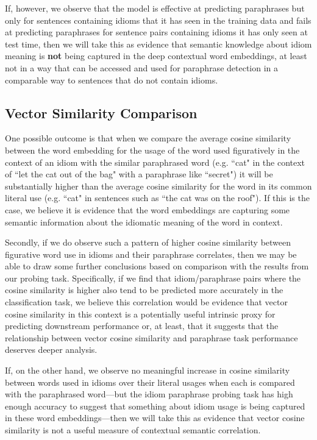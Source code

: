 \documentclass[11pt,a4paper]{article}
\begin{document}
If, however, we observe that the model is effective at predicting paraphrases but only for sentences containing idioms that it has seen in the training data and fails at predicting paraphrases for sentence pairs containing idioms it has only seen at test time, then we will take this as evidence that semantic knowledge about idiom meaning is \textbf{not} being captured in the deep contextual word embeddings, at least not in a way that can be accessed and used for paraphrase detection in a comparable way to sentences that do not contain idioms.

\subsection{Vector Similarity Comparison}
One possible outcome is that when we compare the average cosine similarity between the word embedding for the usage of the word used figuratively in the context of an idiom with the similar paraphrased word (e.g. ``cat" in the context of ``let the cat out of the bag" with a paraphrase like ``secret")  it will be substantially higher than the average cosine similarity for the word in its common literal use (e.g. ``cat" in sentences such as ``the cat was on the roof"). If this is the case, we believe it is evidence that the word embeddings are capturing some semantic information about the idiomatic meaning of the word in context. 

Secondly, if we do observe such a pattern of higher cosine similarity between figurative word use in idioms and their paraphrase correlates, then we may be able to draw some further conclusions based on comparison with the results from our probing task. Specifically, if we find that idiom/paraphrase pairs where the cosine similarity is higher also tend to be predicted more accurately in the classification task, we believe this correlation would be evidence that vector cosine similarity in this context is a potentially useful intrinsic proxy for predicting downstream performance or, at least, that it suggests that the relationship between vector cosine similarity and paraphrase task performance deserves deeper analysis. 

If, on the other hand, we observe no meaningful increase in cosine similarity between words used in idioms over their literal usages when each is compared with the paraphrased word---but the idiom paraphrase probing task has high enough accuracy to suggest that something about idiom usage is being captured in these word embeddings---then we will take this as evidence that vector cosine similarity is not a useful measure of contextual semantic correlation.
\end{document}
